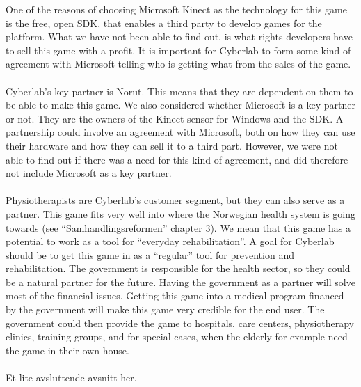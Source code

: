One of the reasons of choosing Microsoft Kinect as the technology for this game is the free, open SDK, that enables a third party to develop games for the platform. What we have not been able to find out, is what rights developers have to sell this game with a profit. It is important for Cyberlab to form some kind of agreement with Microsoft telling who is getting what from the sales of the game. \\ \\
Cyberlab’s key partner is Norut. This means that they are dependent on them to be able to make this game. We also considered whether Microsoft is a key partner or not. They are the owners of the Kinect sensor for Windows and the SDK. A partnership could involve an agreement with Microsoft, both on how they can use their hardware and how they can sell it to a third part. However, we were not able to find out if there was a need for this kind of agreement, and did therefore not include Microsoft as a key partner. \\ \\
Physiotherapists are Cyberlab's customer segment, but they can also serve as a partner. This game fits very well into where the Norwegian health system is going towards (see “Samhandlingsreformen” chapter 3). We mean that this game has a potential to work as a tool for “everyday rehabilitation”. A goal for Cyberlab should be to get this game in as a “regular” tool for prevention and rehabilitation. The government is responsible for the health sector, so they could be a natural partner for the future. Having the government as a partner will solve most of the financial issues. Getting this game into a medical program financed by the government will make this game very credible for the end user. The government could then provide the game to hospitals, care centers, physiotherapy clinics, training groups, and for special cases, when the elderly for example need the game in their own house. \\ \\ 
Et lite avsluttende avsnitt her.
